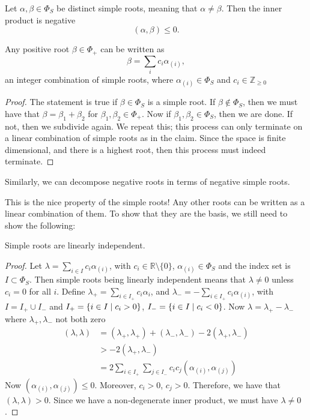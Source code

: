 \begin{claim}
  Let $\alpha, \beta \in \Phi_S$ be distinct simple roots, meaning that $\alpha \neq \beta$. Then the inner product is negative
  \begin{equation}
    (\alpha, \beta) \leq 0.
  \end{equation}
\end{claim}
\begin{claim}
  \label{cl:19-4}
  Any positive root $\beta \in \Phi_+$ can be written as
  \begin{equation}
    \beta = \sum_i c_i \alpha_{(i)},
  \end{equation}
  an integer combination of simple roots, where $\alpha_{(i)} \in \Phi_S$ and $c_{i} \in \mathbb{Z}_{\geq 0}$
\end{claim}
\begin{proof}
  The statement is true if $\beta \in \Phi_S$ is a simple root.
  If $\beta \not \in \Phi_S$, then we must have that  $\beta = \beta_1 + \beta_2$ for $\beta_1, \beta_2 \in \Phi_+$.
  Now if $\beta_1, \beta_2 \in \Phi_S$, then we are done. If not, then we subdivide again. We repeat this; this process can only terminate on a linear combination of simple roots as in the claim. Since the space is finite dimensional, and there is a highest root, then this process must indeed terminate.
\end{proof}

\begin{remark}
  Similarly, we can decompose negative roots in terms of negative simple roots.
\end{remark}
This is the nice property of the simple roots! Any other roots can be written as a linear combination of them.
To show that they are the basis, we still need to show the following:
\begin{claim}
  \label{cl:19-5}
  Simple roots are linearly independent.
\end{claim}
\begin{proof}
  Let $\lambda = \sum_{i \in I} c_{i} \alpha_{(i)}$, with $c_{i} \in \mathbb{R}\setminus{\{0\}}$, $\alpha_{(i)} \in \Phi_S$ and the index set is $I \subset \Phi_S$.
  Then simple roots being linearly independent means that $\lambda \neq 0$ unless $c_{i} = 0$ for all $i$.
  Define $\lambda_+ = \sum_{i\in I_+} c_{i} \alpha_{i}$, and $\lambda_- = -\sum_{i \in I_+} c_{i} \alpha_{(i)}$, with $I = I_+ \cup I_-$ and $I_+ = \left\{ i \in I \suchthat c_{i} > 0 \right\}$, $I_- = \left\{ i \in I \suchthat c_i < 0 \right\}$.
  Now $\lambda = \lambda_+ - \lambda_-$ where $\lambda_+, \lambda_-$ not both zero
  \begin{align}
    (\lambda, \lambda) &= (\lambda_+, \lambda_+) + (\lambda_-, \lambda_-) - 2(\lambda_+, \lambda_-) \\
		       &> -2 (\lambda_+, \lambda_-) \\
		       &= 2 \sum_{i\in I_+} \sum_{j \in I_-} c_{i} c_{j} (\alpha_{(i)}, \alpha_{(j)})
  \end{align}
  Now $(\alpha_{(i)}, \alpha_{(j)}) \leq 0$. Moreover, $c_{i} > 0$, $c_{j} > 0$. Therefore, we have that $(\lambda, \lambda) > 0$. Since we have a non-degenerate inner product, we must have $\lambda \neq 0$.
\end{proof}

